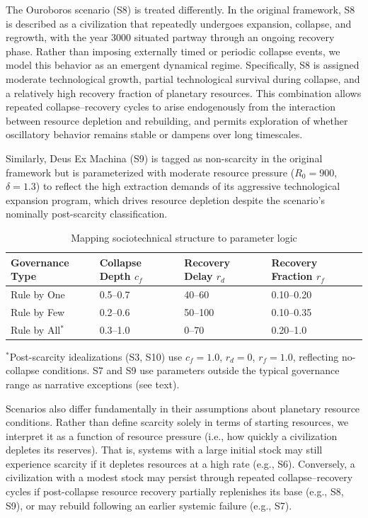 The Ouroboros scenario (S8) is treated differently. In the original framework, S8 is described as a civilization that repeatedly undergoes expansion, collapse, and regrowth, with the year 3000 situated partway through an ongoing recovery phase. Rather than imposing externally timed or periodic collapse events, we model this behavior as an emergent dynamical regime. Specifically, S8 is assigned moderate technological growth, partial technological survival during collapse, and a relatively high recovery fraction of planetary resources. This combination allows repeated collapse--recovery cycles to arise endogenously from the interaction between resource depletion and rebuilding, and permits exploration of whether oscillatory behavior remains stable or dampens over long timescales.

Similarly, Deus Ex Machina (S9) is tagged as non-scarcity in the original framework but is parameterized with moderate resource pressure ($R_0 = 900$, $\delta = 1.3$) to reflect the high extraction demands of its aggressive technological expansion program, which drives resource depletion despite the scenario's nominally post-scarcity classification.

\begin{table}[htbp]
\centering
\caption{Mapping sociotechnical structure to parameter logic}
\label{tab:governance}
\begin{tabular}{llll}
\toprule
Governance Type & Collapse Depth $c_f$ & Recovery Delay $r_d$ & Recovery Fraction $r_f$ \\
\midrule
Rule by One & 0.5--0.7 & 40--60 & 0.10--0.20 \\
Rule by Few & 0.2--0.6 & 50--100 & 0.10--0.35 \\
Rule by All$^{*}$ & 0.3--1.0 & 0--70 & 0.20--1.0 \\
\bottomrule
\end{tabular}

\smallskip
{\footnotesize $^{*}$Post-scarcity idealizations (S3, S10) use $c_f = 1.0$, $r_d = 0$, $r_f = 1.0$, reflecting no-collapse conditions. S7 and S9 use parameters outside the typical governance range as narrative exceptions (see text).}
\end{table}

Scenarios also differ fundamentally in their assumptions about planetary resource conditions. Rather than define scarcity solely in terms of starting resources, we interpret it as a function of resource pressure (i.e., how quickly a civilization depletes its reserves). That is, systems with a large initial stock may still experience scarcity if it depletes resources at a high rate (e.g., S6). Conversely, a civilization with a modest stock may persist through repeated collapse--recovery cycles if post-collapse resource recovery partially replenishes its base (e.g., S8, S9), or may rebuild following an earlier systemic failure (e.g., S7).

